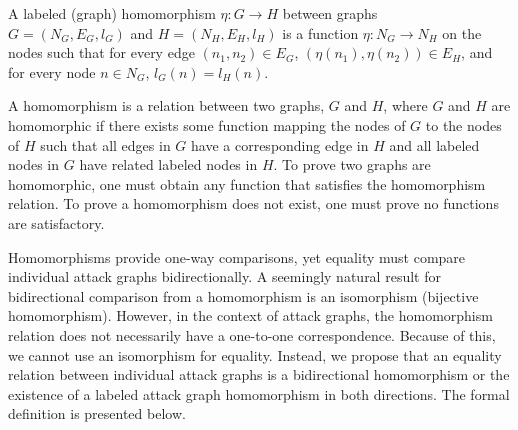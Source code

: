 \documentclass[runningheads]{llncs}
\theoremstyle{definition}
\begin{document}




\begin{definition}[Homomorphism]
    A labeled (graph) homomorphism $\eta : G \to H$ between graphs \\ $G = (N_G, E_G, l_G)$ and $H = (N_H, E_H, l_H)$ is a function $\eta : N_G \to N_H$ on the nodes such that for every edge $(n_1, n_2) \in E_G$, $(\eta(n_1), \eta(n_2)) \in E_H$, and for every node $n \in N_G$, $l_G(n) = l_H(n)$.  \cite{Rowe:2021:OnOrdering}
\end{definition}

A homomorphism is a relation between two graphs, $G$ and $H$, where $G$ and $H$ are homomorphic if there exists some function mapping the nodes of $G$ to the nodes of $H$ such that all edges in $G$ have a corresponding edge in $H$ and all labeled nodes in $G$ have related labeled nodes in $H$. To prove two graphs are homomorphic, one must obtain any function that satisfies the homomorphism relation. To prove a homomorphism does not exist, one must prove no functions are satisfactory. 

Homomorphisms provide one-way comparisons, yet equality must compare individual attack graphs bidirectionally. A seemingly natural result for bidirectional comparison from a homomorphism is an isomorphism (bijective homomorphism). However, in the context of attack graphs, the homomorphism relation does not necessarily have a one-to-one correspondence. Because of this, we cannot use an isomorphism for equality. Instead, we propose that an equality relation between individual attack graphs is a bidirectional homomorphism or the existence of a labeled attack graph homomorphism in both directions. The formal definition is presented below.
\end{document}
